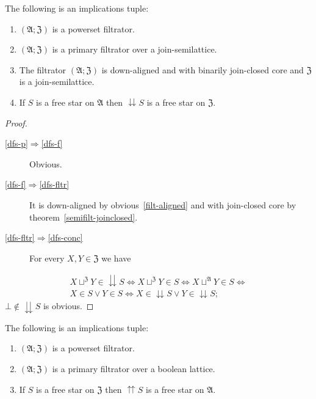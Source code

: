 \begin{prop}
The following is an implications tuple:
\begin{enumerate}
\item \label{dfs-p}$(\mathfrak{A};\mathfrak{Z})$ is a powerset filtrator.
\item \label{dfs-f}$(\mathfrak{A};\mathfrak{Z})$ is a primary filtrator
over a join-semilattice.
\item \label{dfs-fltr}The filtrator $(\mathfrak{A};\mathfrak{Z})$ is down-aligned
and with binarily join-closed core and $\mathfrak{Z}$ is a join-semilattice.
\item \label{dfs-conc}If $S$ is a free star on $\mathfrak{A}$ then $\downdownarrows S$
is a free star on $\mathfrak{Z}$.
\end{enumerate}
\end{prop}
\begin{proof}
~
\begin{description}
\item [{\ref{dfs-p}$\Rightarrow$\ref{dfs-f}}] Obvious.
\item [{\ref{dfs-f}$\Rightarrow$\ref{dfs-fltr}}] It is down-aligned
by obvious~\ref{filt-aligned} and with join-closed core by theorem~\ref{semifilt-joinclosed}.
\item [{\ref{dfs-fltr}$\Rightarrow$\ref{dfs-conc}}] For every $X,Y\in\mathfrak{Z}$
we have
\end{description}

\begin{multline*}
X\sqcup^{\mathfrak{Z}}Y\in\downdownarrows S\Leftrightarrow X\sqcup^{\mathfrak{Z}}Y\in S\Leftrightarrow X\sqcup^{\mathfrak{A}}Y\in S\Leftrightarrow\\
X\in S\vee Y\in S\Leftrightarrow X\in\downdownarrows S\vee Y\in\downdownarrows S;
\end{multline*}
 $\bot\notin\downdownarrows S$ is obvious.

\end{proof}
\begin{prop}
The following is an implications tuple:
\begin{enumerate}
\item \label{ufs-p}$(\mathfrak{A};\mathfrak{Z})$ is a powerset filtrator.
\item \label{ufs-filt}$(\mathfrak{A};\mathfrak{Z})$ is a primary filtrator
over a boolean lattice.
\item \label{ufs-conc}If $S$ is a free star on $\mathfrak{Z}$ then $\upuparrows S$
is a free star on $\mathfrak{A}$.
\end{enumerate}
\end{prop}
